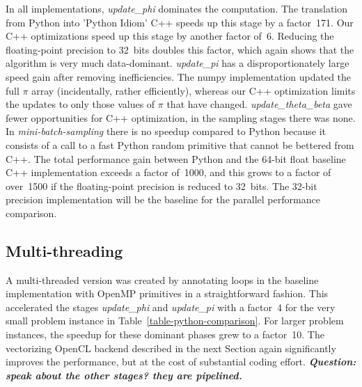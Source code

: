In all implementations, \textit{update\_phi} dominates the computation.
The translation from Python into 'Python Idiom' C++ speeds up this stage
by a factor~171. %
Our C++ optimizations speed up this stage
by another factor of~6. Reducing the floating-point precision to 32~bits
doubles this factor, which again shows that the algorithm is very much data-dominant.
%
\textit{update\_pi} has a disproportionately large speed
gain after removing inefficiencies. The numpy implementation updated the full
$\pi$ array (incidentally, rather efficiently), whereas our C++ optimization
limits the updates to only those values of $\pi$ that have changed.
%
\textit{update\_theta\_beta} gave fewer opportunities for C++ optimization,
in the sampling stages there was none. In \textit{mini-batch-sampling} there
is no speedup compared to Python because it consists of a call to
a fast Python random primitive that cannot be bettered from C++.
The total performance gain between Python and the 64-bit float baseline C++
implementation exceeds a factor of~1000, and this grows to a factor of over~1500
if the floating-point precision is reduced to 32~bits. The 32-bit precision
implementation will be the baseline for the parallel performance comparison.

\subsection{Multi-threading}

A multi-threaded version was created by annotating loops in the
baseline implementation with OpenMP primitives in a straightforward
fashion. This accelerated the stages \textit{update\_phi} and
\textit{update\_pi} with a factor~4 for the very small problem instance
in Table~\ref{table-python-comparison}. For larger problem instances, the
speedup for these dominant phases grew to a factor~10. The vectorizing OpenCL
backend described in the next Section again significantly improves the
performance, but at the cost of substantial coding effort.
\textbf{\emph{Question: speak about the other stages? they are pipelined.}}

\begin{comment}
The introduction of a custom user-space random generator brings at most
a very small
benefit. We show it, because it is necessary for the multi-threaded
implementations described in the next section, and this measurement serves to
prove that it does not harm execution speed.
\end{comment}

